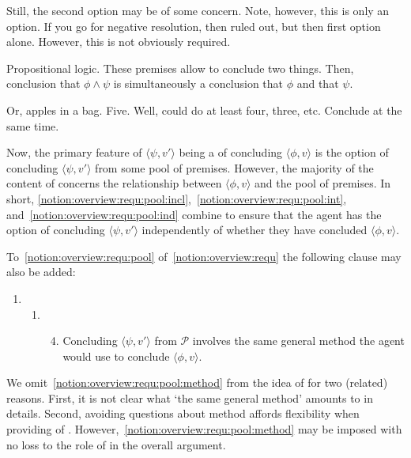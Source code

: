 \begin{note}
  Still, the second option may be of some concern.
  Note, however, this is only an option.
  If you go for negative resolution, then ruled out, but then first option alone.
  However, this is not obviously required.

  Propositional logic.
  These premises allow to conclude two things.
  Then, conclusion that \(\phi \land \psi\) is simultaneously a conclusion that \(\phi\) and that \(\psi\).

  Or, apples in a bag.
  Five.
  Well, could do at least four, three, etc.
  Conclude at the same time.
\end{note}

\begin{note}[\requ{1}]
  Now, the primary feature of \(\langle \psi,v' \rangle\) being a \requ{} of concluding \(\langle \phi,v \rangle\) is the option of concluding \(\langle \psi,v' \rangle\) from some pool of premises.
  However, the majority of the content of \label{idea:CS:overview:requ} concerns the relationship between \(\langle \phi,v \rangle\) and the pool of premises.
  In short, \autoref{notion:overview:requ:pool:incl},~\autoref{notion:overview:requ:pool:int}, and~\autoref{notion:overview:requ:pool:ind} combine to ensure that the agent has the option of concluding \(\langle \psi,v' \rangle\) independently of whether they have concluded \(\langle \phi,v \rangle\).
\end{note}


\begin{note}
  To~\autoref{notion:overview:requ:pool} of~\autoref{notion:overview:requ} the following clause may also be added:
  \begin{enumerate}[label=]
  \item
    \begin{enumerate}[label=]
    \item
      \begin{enumerate}[label=\roman*., ref=(\roman*), resume*=csIdeaCounter]
        \setcounter{enumiii}{3}
      \item
        \label{notion:overview:requ:pool:method}
        Concluding \(\langle  \psi,v' \rangle\) from \(\mathcal{P}\) involves the same general method the agent would use to conclude \(\langle \phi,v \rangle\).
      \end{enumerate}
    \end{enumerate}
  \end{enumerate}
  We omit~\autoref{notion:overview:requ:pool:method} from the idea of \csN{} for two (related) reasons.
  First, it is not clear what `the same general method' amounts to in details.
  Second, avoiding questions about method affords flexibility when providing  of \csN{}.
  However,~\autoref{notion:overview:requ:pool:method} may be imposed with no loss to the role of \csN{} in the overall argument.
\end{note}

